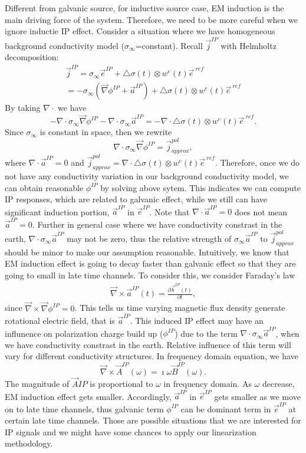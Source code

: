 \documentclass[a4paper, 11pt]{article}
\renewcommand{\div}{\nabla\cdot}
\newcommand{\grad}{\vec \nabla}
\newcommand{\curl}{{\vec \nabla}\times}
\newcommand{\siginf}{\sigma_\infty}
\newcommand{\dsig}{\triangle\sigma}
\newcommand{\B}{\vec{B}}
\renewcommand {\j}  { {\vec j} }
\renewcommand {\b}  { {\vec b} }
\newcommand {\e}  { {\vec e} }
\begin{document}
Different from galvanic source, for inductive source case, EM induction is the main driving force of the system. Therefore, we need to be more careful when we ignore inductie IP effect. Consider a situation where we have homogeneous background conductivity model ($\siginf$=constant). Recall $\j^{IP}$ with Helmholtz decomposition:
\begin{eqnarray*}
    \j^{IP} = \siginf\e^{IP} + \dsig(t)\otimes w^{e}(t)\e^{\ ref} \\
            = -\siginf(\grad\phi^{IP}+\vec{a}^{IP}) + \dsig(t)\otimes w^{e}(t)\e^{\ ref}
\end{eqnarray*}
By taking $\div$ we have
\begin{equation*}
    -\div\siginf\grad\phi^{IP}-\div\siginf\vec{a}^{IP} = -\div\dsig(t)\otimes w^{e}(t)\e^{\ ref}.
\end{equation*}
Since $\siginf$ is constant in space, then we rewrite
\begin{equation*}
    \div\siginf\grad\phi^{IP} = \j^{pol}_{approx},
\end{equation*}
where $\div\vec{a}^{IP}=0$ and $\j^{pol}_{approx}  = \div\dsig(t)\otimes w^{e}(t)\e^{\ ref}$. Therefore, once we do not have any conductivity variation in our background conductivity model, we can obtain reasonable $\phi^{IP}$ by solving above sytem. This indicates we can compute IP responses, which are related to galvanic effect, while we still can have significant induction portion, $\vec{a}^{IP}$ in $\e^{IP}$. Note that $\div\vec{a}^{IP}=0$ does not mean $\vec{a}^{IP}=0$. Further in general case where we have conductivity constrast in the earth, $\div \siginf \vec{a}^{IP}$ may not be zero, thus the relative strength of  $\siginf \vec{a}^{IP}$ to $\j^{pol}_{approx}$ should be minor to make our assumption reasonable. Intuitively, we know that EM induction effect is going to decay faster than galvanic effect so that they are going to small in late time channels. To consider this, we consider Faraday's law
\begin{eqnarray*}
    \curl \vec{a}^{IP}(t) = \frac{\partial \b^{IP}(t)}{\partial t},
\end{eqnarray*}
since $\curl \grad \phi^{IP} = 0$. This tells us time varying magnetic flux density generate rotational electric field, that is $\vec{a}^{IP}$. This induced IP effect may have an influnence on polarization charge build up ($\phi^{IP}$) due to the term $\div\siginf\vec{a}^{IP}$, when we have conductivity constrast in the earth. Relative influence of this term will vary for different conductivity structures. 
In frequency domain equation, we have
\begin{equation*}
    \curl \vec{A}^{IP}(\omega) = \imath\omega\B^{IP}(\omega).
\end{equation*}
The magnitude of $\vec{A}{IP}$ is proportional to $\omega$ in frequency domain. As $\omega$ decrease, EM induction effect gets smaller. Accordingly, $\vec{a}^{IP}$ in $\e^{IP}$ gets smaller as we move on to late time channels, thus galvanic term $\phi^{IP}$ can be dominant term in $\e^{IP}$ at certain late time channels. Those are possible situations that we are interested for IP signals and we might have some chances to apply our linearization methodology.
\end{document}
